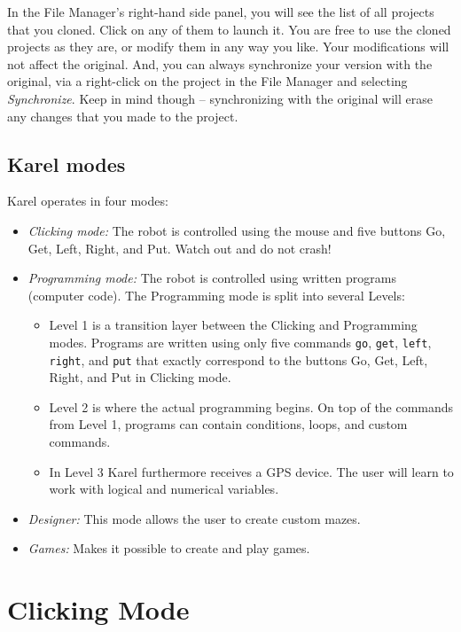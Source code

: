 In the File Manager's right-hand side panel, you will see the list of all 
projects that you cloned. Click on any of them to launch it. You are free to 
use the cloned projects as they are, or modify them in any way you like. Your 
modifications will not affect the original. And, you can 
always synchronize your version with the original, via 
a right-click on the project in the File Manager and selecting {\em Synchronize}.
Keep in mind though -- synchronizing with the original will erase any changes that 
you made to the project.

\subsection{Karel modes} \label{levels}

Karel operates in four modes:
\begin{itemize}
\item {\em Clicking mode:} The robot is controlled using the mouse and five buttons Go, Get, Left, Right, and Put. 
      Watch out and do not crash!
\item {\em Programming mode:} The robot is controlled using written programs (computer code). The Programming mode is 
      split into several Levels:
\begin{itemize}
\item Level 1 is a transition layer between the Clicking and Programming modes. Programs are written using only 
      five commands {\tt go}, {\tt get}, {\tt left}, {\tt right}, and {\tt put} that exactly correspond to 
      the buttons Go, Get, Left, Right, and Put in Clicking mode.
\item Level 2 is where the actual programming begins. On top of the commands from Level 1, programs can contain 
      conditions, loops, and custom commands.
\item In Level 3 Karel furthermore receives a GPS device. The user will learn to work with logical 
      and numerical variables. 
\end{itemize}
\item {\em Designer:} This mode allows the user to create custom mazes.
\item {\em Games:} Makes it possible to create and play games. 
\end{itemize}


\section{Clicking Mode} \label{sec:manual}

